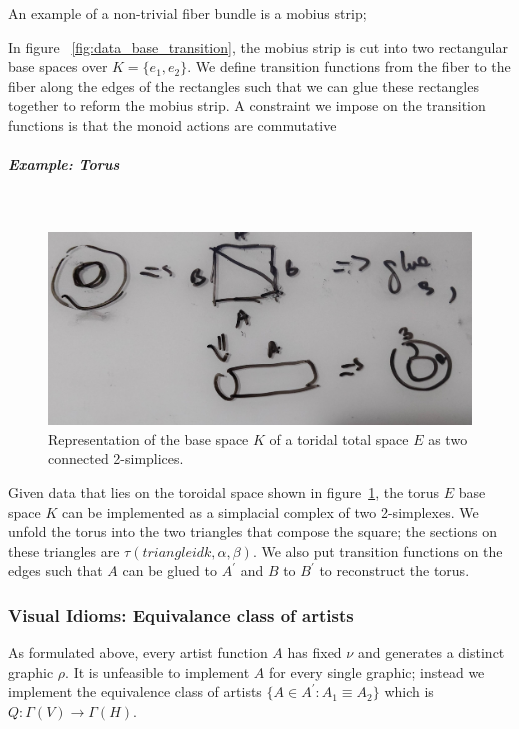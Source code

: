 \documentclass[../main.tex]{subfiles}
\begin{document}
 An example of a non-trivial fiber bundle is a mobius strip\cite{find the citation for why};

In figure ~\ref{fig:data_base_transition}, the mobius strip is cut into two rectangular base spaces over $K=\{e_1, e_2\}$. We define transition functions from the fiber to the fiber along the edges of the rectangles such that we can glue these rectangles together to reform the mobius strip. A constraint we impose on the transition functions is that the monoid actions are commutative

\subparagraph{Example: Torus}\mbox{}\\
\begin{figure}[H]
    \label{fig:triangle_torus}
    \includegraphics[width=\textwidth]{figures/math/triangle_torus.png}
    \caption{Representation of the base space $K$ of a toridal total space $E$ as two connected 2-simplices.}
\end{figure}

Given data that lies on the toroidal space shown in figure~\ref{fig:triangle_torus}, the torus $E$ base space $K$ can be implemented as a simplacial complex of two 2-simplexes. We unfold the torus into the two triangles that compose the square; the sections on these triangles are $\tau(triangle id k, \alpha, \beta)$. We also put transition functions on the edges such that $A$ can be glued to $A^\prime$ and $B$ to $B^\prime$ to reconstruct the torus. 

\subsubsection{Visual Idioms: Equivalance class of artists}
As formulated above, every artist function $A$ has fixed $\nu$ and generates a distinct graphic $\rho$. It is unfeasible to implement $A$ for every single graphic; instead we implement the equivalence class of artists $\{A \in A^\prime: A_{1} \equiv A_{2}\}$ which is $Q:\Gamma(V) \rightarrow \Gamma(H)$. 
\end{document}
